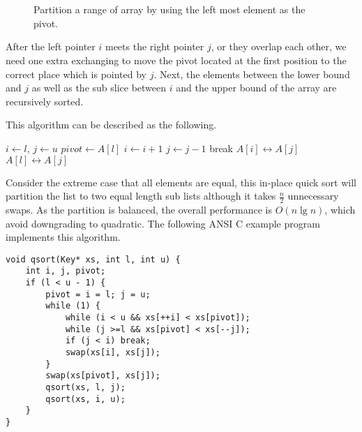 \documentclass[UTF8]{article}
\begin{document}
\begin{figure}[htbp]
   \centering
    \\
    \\
   \caption{Partition a range of array by using the left most element as the pivot.}
   \label{fig:partition-2-way}
\end{figure}

After the left pointer $i$ meets the right pointer $j$, or they overlap each other, we need one extra exchanging
to move the pivot located at the first position to the correct place which is pointed by $j$. Next, the
elements between the lower bound and $j$ as well as the sub slice between $i$ and the upper bound of the array
are recursively sorted.

This algorithm can be described as the following.

\begin{algorithmic}[1]
 \Comment{sort range $[l, u)$}
   
    \State $i \gets l$, $j \gets u$
    \State $pivot \gets A[l]$
    \Loop
      \Repeat
        \State $i \gets i + 1$
       
      \Repeat
        \State $j \gets j - 1$
       
        \State break
      \EndIf
      \State {} $A[i] \leftrightarrow A[j]$
    \EndLoop
    \State {} $A[l] \leftrightarrow A[j]$ 
    \State {}
    \State {}
  \EndIf
\EndProcedure
\end{algorithmic}

Consider the extreme case that all elements are equal, this in-place quick sort will partition
the list to two equal length sub lists although it takes $\frac{n}{2}$ unnecessary swaps.
As the partition is balanced, the overall performance is $O(n \lg n)$, which avoid downgrading
to quadratic. The following ANSI C example program implements this algorithm.

\lstset{language=C}
\begin{lstlisting}
void qsort(Key* xs, int l, int u) {
    int i, j, pivot;
    if (l < u - 1) {
        pivot = i = l; j = u;
        while (1) {
            while (i < u && xs[++i] < xs[pivot]);
            while (j >=l && xs[pivot] < xs[--j]);
            if (j < i) break;
            swap(xs[i], xs[j]);
        }
        swap(xs[pivot], xs[j]);
        qsort(xs, l, j);
        qsort(xs, i, u);
    }
}
\end{lstlisting}
\end{document}
